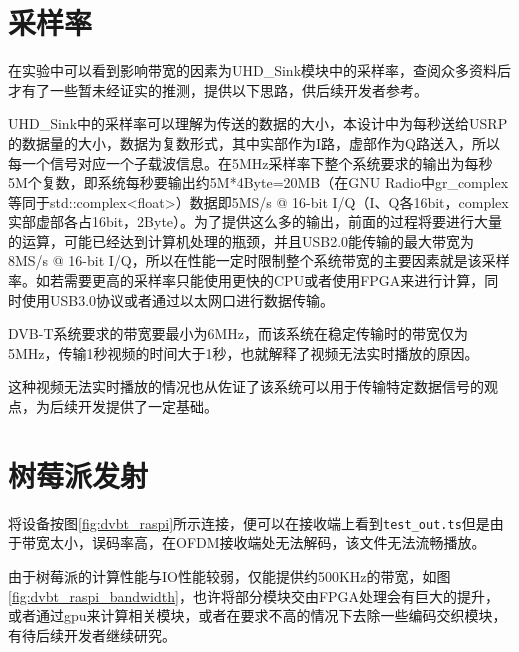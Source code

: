	\section{采样率}
		\label{sec:sample_rate}
		\par 在实验中可以看到影响带宽的因素为UHD\_Sink模块中的采样率，查阅众多资料后才有了一些暂未经证实的推测，提供以下思路，供后续开发者参考。
		\par UHD\_Sink中的采样率可以理解为传送的数据的大小，本设计中为每秒送给USRP的数据量的大小，数据为复数形式，其中实部作为I路，虚部作为Q路送入，所以每一个信号对应一个子载波信息。在5MHz采样率下整个系统要求的输出为每秒5M个复数，即系统每秒要输出约5M*4Byte=20MB（在GNU Radio中gr\_complex等同于std::complex<float>）数据即5MS/s @ 16-bit I/Q（I、Q各16bit，complex实部虚部各占16bit，2Byte）。为了提供这么多的输出，前面的过程将要进行大量的运算，可能已经达到计算机处理的瓶颈，并且USB2.0能传输的最大带宽为8MS/s @ 16-bit I/Q，所以在性能一定时限制整个系统带宽的主要因素就是该采样率。如若需要更高的采样率只能使用更快的CPU或者使用FPGA来进行计算，同时使用USB3.0协议或者通过以太网口进行数据传输。
		\par DVB-T系统要求的带宽要最小为6MHz，而该系统在稳定传输时的带宽仅为5MHz，传输1秒视频的时间大于1秒，也就解释了视频无法实时播放的原因。
		\par 这种视频无法实时播放的情况也从佐证了该系统可以用于传输特定数据信号的观点，为后续开发提供了一定基础。
	\section{树莓派发射}
		\par 将设备按图\ref{fig:dvbt_raspi}所示连接，便可以在接收端上看到\lstinline[language=sh]{test_out.ts}但是由于带宽太小，误码率高，在OFDM接收端处无法解码，该文件无法流畅播放。
		\par 由于树莓派的计算性能与IO性能较弱，仅能提供约500KHz的带宽，如图\ref{fig:dvbt_raspi_bandwidth}，也许将部分模块交由FPGA处理会有巨大的提升，或者通过gpu来计算相关模块，或者在要求不高的情况下去除一些编码交织模块，有待后续开发者继续研究。
		\begin{figure}[htp]
			\centering
			 \\
		\end{figure}
